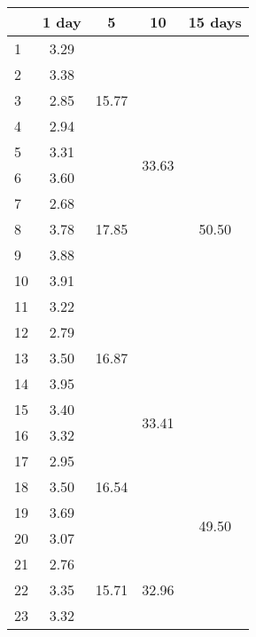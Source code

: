 \begin{center}
\begin{tabular}{| l || c | c | c | c |}\hline
 & 1 day & 5 & 10 & 15 days \\\hline
1 & \multirow{1}{*}{ 3.29 }  & \multirow{5}{*}{ 15.77 }  & \multirow{10}{*}{ 33.63 }  & \multirow{15}{*}{ 50.50 }  \\\cline{2-2}
2 & \multirow{1}{*}{ 3.38 }  & & & \\\cline{2-2}
3 & \multirow{1}{*}{ 2.85 }  & & & \\\cline{2-2}
4 & \multirow{1}{*}{ 2.94 }  & & & \\\cline{2-2}
5 & \multirow{1}{*}{ 3.31 }  & & & \\\cline{2-2}\cline{3-3}
6 & \multirow{1}{*}{ 3.60 }  & \multirow{5}{*}{ 17.85 }  & & \\\cline{2-2}
7 & \multirow{1}{*}{ 2.68 }  & & & \\\cline{2-2}
8 & \multirow{1}{*}{ 3.78 }  & & & \\\cline{2-2}
9 & \multirow{1}{*}{ 3.88 }  & & & \\\cline{2-2}
10 & \multirow{1}{*}{ 3.91 }  & & & \\\cline{2-2}\cline{3-3}\cline{4-4}
11 & \multirow{1}{*}{ 3.22 }  & \multirow{5}{*}{ 16.87 }  & \multirow{10}{*}{ 33.41 }  & \\\cline{2-2}
12 & \multirow{1}{*}{ 2.79 }  & & & \\\cline{2-2}
13 & \multirow{1}{*}{ 3.50 }  & & & \\\cline{2-2}
14 & \multirow{1}{*}{ 3.95 }  & & & \\\cline{2-2}
15 & \multirow{1}{*}{ 3.40 }  & & & \\\cline{2-2}\cline{3-3}\cline{5-5}
16 & \multirow{1}{*}{ 3.32 }  & \multirow{5}{*}{ 16.54 }  & & \multirow{15}{*}{ 49.50 }  \\\cline{2-2}
17 & \multirow{1}{*}{ 2.95 }  & & & \\\cline{2-2}
18 & \multirow{1}{*}{ 3.50 }  & & & \\\cline{2-2}
19 & \multirow{1}{*}{ 3.69 }  & & & \\\cline{2-2}
20 & \multirow{1}{*}{ 3.07 }  & & & \\\cline{2-2}\cline{3-3}\cline{4-4}
21 & \multirow{1}{*}{ 2.76 }  & \multirow{5}{*}{ 15.71 }  & \multirow{10}{*}{ 32.96 }  & \\\cline{2-2}
22 & \multirow{1}{*}{ 3.35 }  & & & \\\cline{2-2}
23 & \multirow{1}{*}{ 3.32 }  & & & \\\cline{2-2}

\end{tabular}
\end{center}
